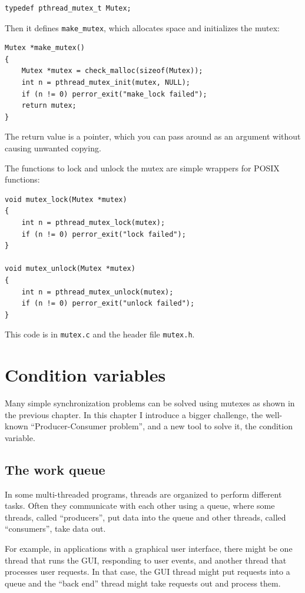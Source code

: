 \documentclass[12pt]{book}
\begin{document}
{\begin{verbatim}
typedef pthread_mutex_t Mutex;
\end{verbatim}

Then it defines \verb"make_mutex", which allocates space and
initializes the mutex:

\begin{verbatim}
Mutex *make_mutex()
{
    Mutex *mutex = check_malloc(sizeof(Mutex));
    int n = pthread_mutex_init(mutex, NULL);
    if (n != 0) perror_exit("make_lock failed"); 
    return mutex;
}
\end{verbatim}

The return value is a pointer, which you can pass around as an
argument without causing unwanted copying.

The functions to lock and unlock the mutex are simple wrappers
for POSIX functions:

\begin{verbatim}
void mutex_lock(Mutex *mutex)
{
    int n = pthread_mutex_lock(mutex);
    if (n != 0) perror_exit("lock failed");
}

void mutex_unlock(Mutex *mutex)
{
    int n = pthread_mutex_unlock(mutex);
    if (n != 0) perror_exit("unlock failed");
}
\end{verbatim}

This code is in {\tt mutex.c} and the header file {\tt mutex.h}.


\chapter{Condition variables}
\label{csem}

Many simple synchronization problems can be solved using mutexes
as shown in the previous chapter.  In this chapter I introduce a
bigger challenge, the well-known ``Producer-Consumer problem'', and
a new tool to solve it, the condition variable.

\section{The work queue}
\label{queue}

In some multi-threaded programs, threads are organized to perform
different tasks.  Often they communicate with each other using a queue,
where some threads, called ``producers'', put data into the queue
and other threads, called ``consumers'', take data out.

For example, in applications with a graphical user interface, there
might be one thread that runs the GUI, responding to user events,
and another thread that processes user requests.  In that case,
the GUI thread might put requests into a queue and the ``back end''
thread might take requests out and process them.

}
\end{document}
